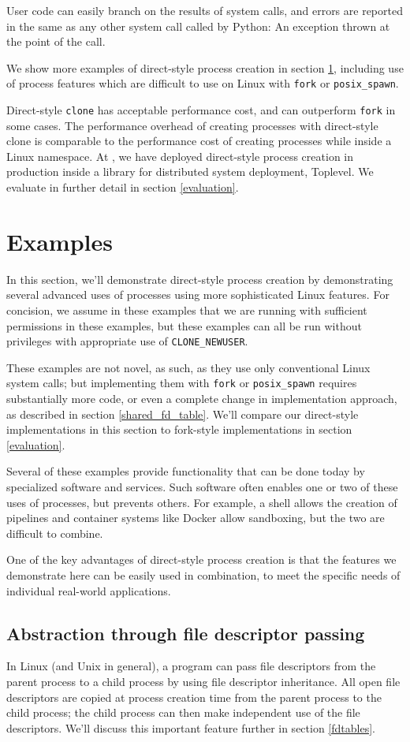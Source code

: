\documentclass[letterpaper,twocolumn,10pt]{article}
\begin{document}
User code can easily branch on the results of system calls,
and errors are reported in the same as any other system call called by Python:
An exception thrown at the point of the call.

We show more examples of direct-style process creation in section \ref{examples},
including use of process features which are difficult to use on Linux with \texttt{fork} or \texttt{posix\_spawn}.

Direct-style \texttt{clone} has acceptable performance cost,
and can outperform \texttt{fork} in some cases.
The performance overhead of creating processes with direct-style clone
is comparable to the performance cost of creating processes while inside a Linux namespace.
At \twosigma, we have deployed direct-style process creation in production
inside a library for distributed system deployment, Toplevel.
We evaluate in further detail in section \ref{evaluation}.
\section{Examples}\label{examples}
In this section,
we'll demonstrate direct-style process creation
by demonstrating several advanced uses of processes
using more sophisticated Linux features.
For concision, we assume in these examples that we are running with sufficient permissions in these examples,
but these examples can all be run without privileges with appropriate use of \verb|CLONE_NEWUSER|.

These examples are not novel, as such, as they use only conventional Linux system calls;
but implementing them with \texttt{fork} or \verb|posix_spawn| requires substantially more code,
or even a complete change in implementation approach,
as described in section \ref{shared_fd_table}.
We'll compare our direct-style implementations in this section
to fork-style implementations
in section \ref{evaluation}.

Several of these examples provide functionality that can be done today by specialized software and services.
Such software often enables one or two of these uses of processes, but prevents others.
For example, a shell allows the creation of pipelines and container systems like Docker allow sandboxing,
but the two are difficult to combine.\cite{docker_pipe}

One of the key advantages of direct-style process creation is that the features we demonstrate here
can be easily used in combination,
to meet the specific needs of individual real-world applications.
\subsection{Abstraction through file descriptor passing}\label{fd_abstraction}
In Linux (and Unix in general),
a program can pass file descriptors from the parent process to a child process
by using file descriptor inheritance.
All open file descriptors are copied at process creation time from the parent process to the child process;
the child process can then make independent use of the file descriptors.
We'll discuss this important feature further in section \ref{fdtables}.
\end{document}
